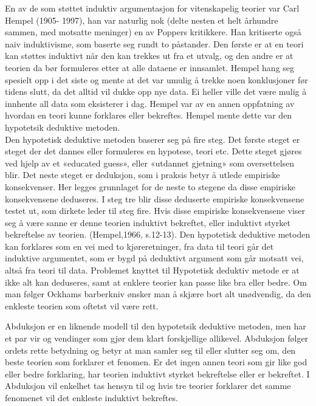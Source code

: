 \documentclass[
]{book}
\begin{document}
En av de som støttet induktiv argumentasjon for vitenskapelig teorier var Carl Hempel (1905- 1997), han var naturlig nok (delte nesten et helt århundre sammen, med motsatte meninger) en av Poppers kritikkere. Han kritiserte også naiv induktivisme, som baserte seg rundt to påstander. Den første er at en teori kan støttes induktivt når den kan trekkes ut fra et utvalg, og den andre er at teorien da bør formuleres etter at alle dataene er innsamlet. Hempel hang seg spesielt opp i det siste og mente at det var umulig å trekke noen konklusjoner før tidens slutt, da det alltid vil dukke opp nye data. Ei heller ville det være mulig å innhente all data som eksisterer i dag. \citep[s. 11]{hempel1966} Hempel var av en annen oppfatning av hvordan en teori kunne forklares eller bekreftes. Hempel mente dette var den hypotetsik deduktive metoden.\\

Den hypotetisk deduktive metoden baserer seg på fire steg. Det første steget er steget der det dannes eller formuleres en hypotese, teori etc. Dette steget gjøres ved hjelp av et «educated guess», eller «utdannet gjetning» som oversettelsen blir. Det neste steget er deduksjon, som i praksis betyr å utlede empiriske konsekvenser. Her legges grunnlaget for de neste to stegene da disse empiriske konsekvensene deduseres. I steg tre blir disse deduserte empiriske konsekvensene testet ut, som dirkete leder til steg fire. Hvis disse empiriske konsekvensene viser seg å være sanne er denne teorien induktivt bekreftet, eller induktivt styrket bekreftelse av teorien. (Hempel,1966, s.12-13). Den hypotetisk deduktive metoden kan forklares som en vei med to kjøreretninger, fra data til teori går det induktive argumentet, som er bygd på deduktivt argument som går motsatt vei, altså fra teori til data. Problemet knyttet til Hypotetisk deduktiv metode er at ikke alt kan deduseres, samt at enklere teorier kan passe like bra eller bedre. Om man følger Ockhams barberkniv ønsker man å skjære bort alt unødvendig, da den enkleste teorien som oftetst vil være rett.

Abduksjon er en liknende modell til den hypotetsik deduktive metoden, men har et par vir og vendinger som gjør dem klart forskjellige allikevel. Abduksjon følger ordets rette betydning og betyr at man samler seg til eller slutter seg om, den beste teorien som forklarer et fenomen. Er det ingen annen teori som gir like god eller bedre forklaring, har teorien induktivt styrket bekreftelse eller er bekreftet. I Abduksjon vil enkelhet tas hensyn til og hvis tre teorier forklarer det samme fenomenet vil det enkleste induktivt bekreftes.
\end{document}

